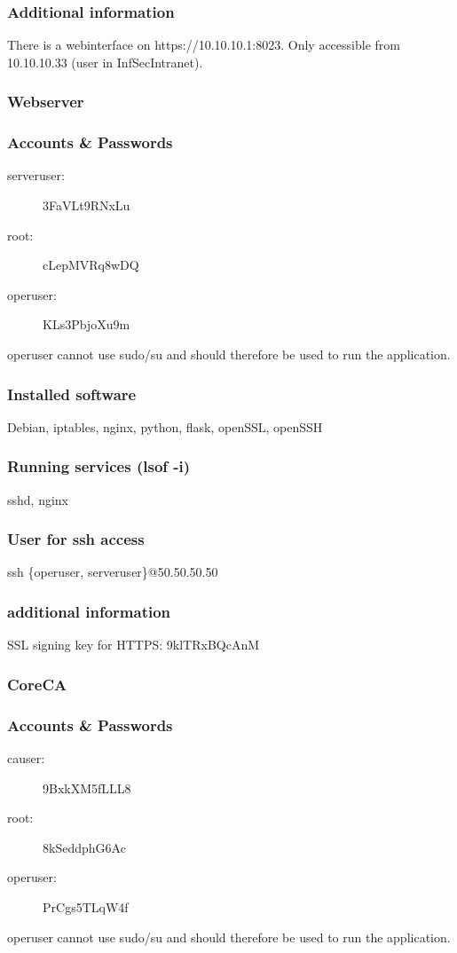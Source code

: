 \documentclass[a4paper, toc=index, 12pt, DIV14, twoside, BCOR2cm, headsepline, numbers=noenddot, bibliography=totoc]{scrbook}
\begin{document}
\subsubsection*{Additional information}
There is a webinterface on https://10.10.10.1:8023. Only accessible from 10.10.10.33 (user in InfSecIntranet).

\subsubsection{Webserver}
\subsubsection*{Accounts \& Passwords}
\begin{multicols}{2}
\begin{description}
\item[serveruser:] 3FaVLt9RNxLu
\item[root:] cLepMVRq8wDQ
\item[operuser:] KLs3PbjoXu9m
\end{description}
\end{multicols}
operuser cannot use sudo/su and should therefore be used to run the application.
\subsubsection*{Installed software}
Debian, iptables, nginx, python, flask, openSSL, openSSH
\subsubsection*{Running services (lsof -i)}
sshd, nginx
\subsubsection*{User for ssh access}
ssh \{operuser, serveruser\}@50.50.50.50
\subsubsection*{additional information}
SSL signing key for HTTPS: 9klTRxBQcAnM

\subsubsection{CoreCA}
\subsubsection*{Accounts \& Passwords}
\begin{multicols}{2}
\begin{description}
\item[causer:] 9BxkXM5fLLL8
\item[root:] 8kSeddphG6Ac
\item[operuser:] PrCgs5TLqW4f
\end{description}
\end{multicols}
operuser cannot use sudo/su and should therefore be used to run the application.
\end{document}
